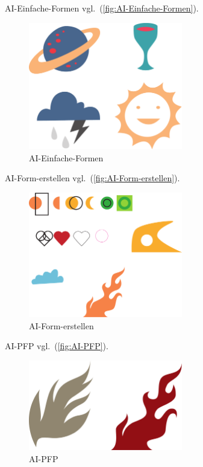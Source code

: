 AI-Einfache-Formen vgl.~(\autoref{fig:AI-Einfache-Formen}).

\begin{figure}[!hb]%
\centering
\includegraphics[width=0.6\textwidth]{Grafiken/AI-Einfache-Formen.pdf}
\caption{AI-Einfache-Formen}
\label{fig:AI-Einfache-Formen}%
\end{figure}


AI-Form-erstellen vgl.~(\autoref{fig:AI-Form-erstellen}).

\begin{figure}[!hb]%
\centering
\includegraphics[width=0.6\textwidth]{Grafiken/AI-Form-erstellen.pdf}
\caption{AI-Form-erstellen}
\label{fig:AI-Form-erstellen}%
\end{figure}

AI-PFP vgl.~(\autoref{fig:AI-PFP}).

\begin{figure}[!hb]%
\centering
\includegraphics[width=0.6\textwidth]{Grafiken/AI-PFP.pdf}
\caption{AI-PFP}
\label{fig:AI-PFP}%
\end{figure}

